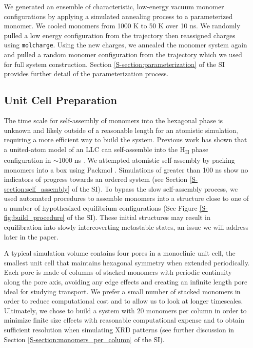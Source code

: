 \documentclass[journal=jpcbfk,manuscript=article]{achemso}
\begin{document}
  We generated an ensemble of characteristic, low-energy vacuum monomer
  configurations by applying a simulated annealing process to a
  parameterized monomer. We cooled monomers from 1000 K to 50 K over 10
  ns. We randomly pulled a low energy configuration from the
  trajectory then reassigned charges using \texttt{molcharge}. Using the new
  charges, we annealed the monomer system again and pulled a random monomer
  configuration from the trajectory which we used for full system
  construction. Section \ref{S-section:parameterization} 
  of the SI provides further detail of the parameterization process.

  \subsection{Unit Cell Preparation}\label{method:unitcell_build}

  The time scale for self-assembly of monomers into the hexagonal phase is
  unknown and likely outside of a reasonable length for an atomistic simulation,
  requiring a more efficient way to build the system. Previous work has shown
  that a united-atom model of an LLC can self-assemble into the
  H\textsubscript{II} phase configuration in $\sim$1000 ns
  \cite{mondal_self-assembly_2013}. We attempted atomistic self-assembly by
  packing monomers into a box using Packmol \cite{martinez_packmol:_2009}.
  Simulations of greater than 100 ns show no indicators of progress towards an
  ordered system (see Section \ref{S-section:self_assembly} of the SI). To bypass
  the slow self-assembly process, we used automated procedures to
  assemble monomers into a structure close to one of a number of hypothesized
  equilibrium configurations (See Figure \ref{S-fig:build_procedure} of the SI).
  These initial structures may result in equilibration into slowly-intercoverting
  metastable states, an issue we will address later in the paper. 

  A typical simulation volume contains four pores in a monoclinic unit cell,
  the smallest unit cell that maintains hexagonal symmetry when extended
  periodically. Each pore is made of columns of stacked monomers with periodic
  continuity along the pore axis, avoiding any edge effects and creating an
  infinite length pore ideal for studying transport. We prefer a small number of stacked
  monomers in order to reduce computational cost and to allow us to look at
  longer timescales. Ultimately, we chose to build a system with 20 monomers
  per column in order to minimize finite size effects with reasonable computational expense 
  and to obtain sufficient resolution when simulating XRD patterns (see further discussion
  in Section \ref{S-section:monomers_per_column} of the SI).
 
\end{document}
